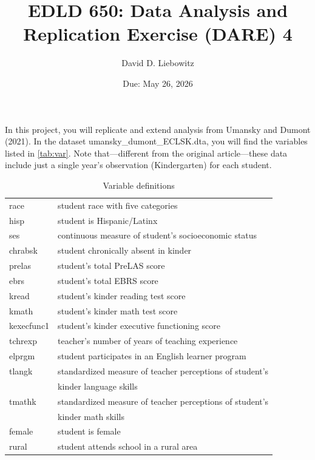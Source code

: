 \documentclass[a4paper, 11pt]{article}
\title{EDLD 650: Data Analysis and Replication Exercise (DARE) 4}
\author{David D. Liebowitz}
\date{Due: May 26, 2026}
\begin{document}
\maketitle

In this project, you will replicate and extend analysis from Umansky and Dumont (2021). In the dataset umansky\_dumont\_ECLSK.dta, you will find the variables listed in \autoref{tab:var}. Note that---different from the original article---these data include just a single year's observation (Kindergarten) for each student.

\begin{table}[!htbp] \centering 
  \caption{Variable definitions} 

  \label{tab:var} 
\begin{tabular}{ll} 
\hline
\hline
race  &    student race with five categories \\
hisp & student is Hispanic/Latinx \\
ses      &    continuous measure of student's socioeconomic status \\
chrabsk &     student chronically absent in kinder \\
prelas      &   student's total PreLAS score \\
ebrs          & student's total EBRS score \\
kread         &   student's kinder reading test score \\
kmath           &  student's kinder math test score \\
kexecfunc1     &   student's kinder executive functioning score \\
tchrexp         & teacher's number of years of teaching experience \\
elprgm      & student participates in an English learner program \\
tlangk        &     standardized measure of teacher perceptions of student's \\
&				 kinder language skills \\
tmathk        &  standardized measure of teacher perceptions of student's \\
&				kinder math skills \\
female       &student is female \\
rural          & student attends school in a rural area \\

\hline
\hline

\end{tabular}
\end{table}
\end{document}
